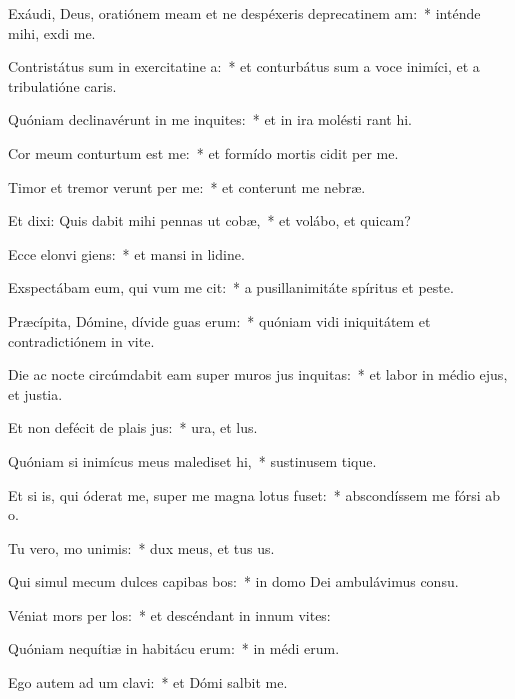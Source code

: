 \item Exáudi, Deus, oratiónem meam et ne despéxeris deprecatinem am:~* inténde mihi,  exdi me.
\item Contristátus sum in exercitatine a:~* et conturbátus sum a voce inimíci, et a tribulatióne caris.
\item Quóniam declinavérunt in me inquites:~* et in ira molésti rant hi.
\item Cor meum conturtum est  me:~* et formído mortis cidit per me.
\item Timor et tremor verunt per me:~* et conterunt me nebræ.
\item Et dixi: Quis dabit mihi pennas ut cobæ,~* et volábo, et quicam?
\item Ecce elonvi giens:~* et mansi in lidine.
\item Exspectábam eum, qui vum me cit:~* a pusillanimitáte spíritus et peste.
\item Præcípita, Dómine, dívide guas erum:~* quóniam vidi iniquitátem et contradictiónem in vite.
\item Die ac nocte circúmdabit eam super muros jus inquitas:~* et labor in médio ejus, et justia.
\item Et non defécit de plais jus:~* ura, et lus.
\item Quóniam si inimícus meus malediset hi,~* sustinusem tique.
\item Et si is, qui óderat me, super me magna lotus fuset:~* abscondíssem me fórsi ab o.
\item Tu vero, mo unimis:~* dux meus, et tus us.
\item Qui simul mecum dulces capibas bos:~* in domo Dei ambulávimus  consu.
\item Véniat mors per los:~* et descéndant in innum vites:
\item Quóniam nequítiæ in habitácu erum:~* in médi erum.
\item Ego autem ad um clavi:~* et Dómi salbit me.
